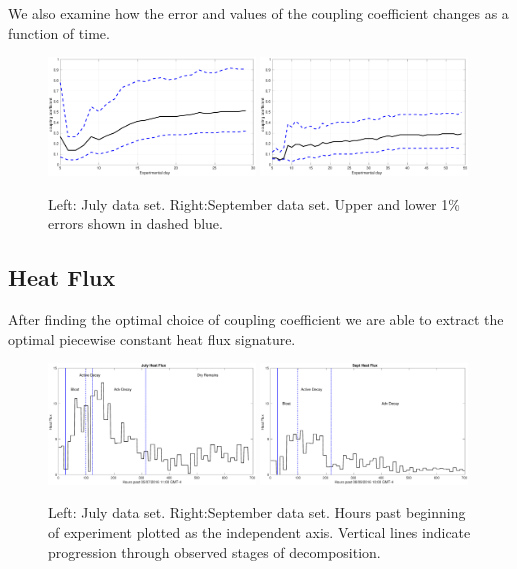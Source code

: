 \documentclass{beamer}
\begin{document}
\begin{frame}
We also examine how the error and values of the coupling coefficient
changes as a function of time.
\begin{figure}
\includegraphics[width=0.49\textwidth]{Figures/jul_c_bounds}
\includegraphics[width=0.49\textwidth]{Figures/sept_c_bounds2}
\caption{Left: July data set. Right:September data set. Upper and
  lower 1\% errors shown in dashed blue.}
\end{figure}

\end{frame}

\subsection{Heat Flux}
\begin{frame}
After finding the optimal choice of coupling coefficient we are able
to extract the optimal piecewise constant heat flux signature.
\begin{figure}
  \includegraphics[width=0.49\textwidth]{Figures/jul_s}
  \includegraphics[width=0.49\textwidth]{Figures/sept_s_part}
  \caption{Left: July data set. Right:September data set. Hours past
    beginning of experiment plotted as the independent axis. Vertical
    lines indicate progression through observed stages of decomposition.}
\end{figure}
\end{frame}
\end{document}
